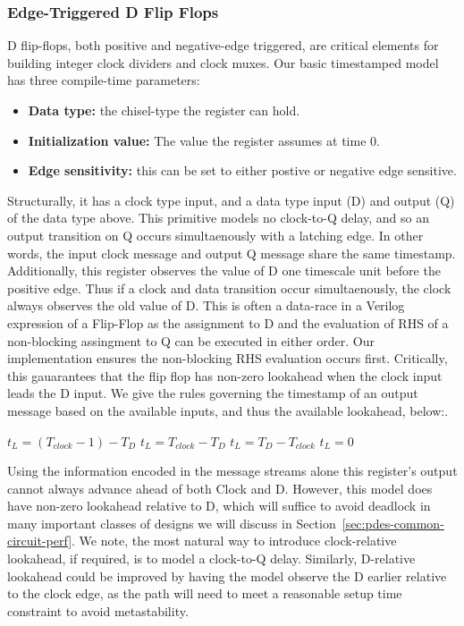 \subsubsection{Edge-Triggered D Flip Flops}
D flip-flops, both positive and negative-edge triggered, are critical elements for
building integer clock dividers and clock muxes. Our basic timestamped model has three compile-time parameters:

\begin{itemize}
 \item \textbf{Data type:} the chisel-type the register can hold.
 \item \textbf{Initialization value:} The value the register assumes at time 0.
 \item \textbf{Edge sensitivity:} this can be set to either postive or negative edge sensitive.
\end{itemize}

Structurally, it has a clock type input, and a data type input (D) and output
(Q) of the data type above.  This primitive models no clock-to-Q delay, and so
an output transition on Q occurs simultaenously with a latching edge.  In other
words, the input clock message and output Q message share the same timestamp.
Additionally, this register observes the value of D one timescale unit before
the positive edge. Thus if a clock and data transition occur simultaenously,
the clock always observes the old value of D.  This is often a data-race in a
Verilog expression of a Flip-Flop as the assignment to D and the evaluation of
RHS of a non-blocking assingment to Q can be executed in either order. Our
implementation ensures the non-blocking RHS evaluation occurs first.
Critically, this gauarantees that the flip flop has non-zero lookahead when the
clock input leads the D input. We give the rules governing the timestamp of an
output message based on the available inputs, and thus the available lookahead,
below:.

\begin{algorithmic}
            \State $t_{L} = (T_{clock} - 1) - T_{D}$
        \Else
            \State $t_{L} = T_{clock} - T_{D}$
        \EndIf
    \Else
            \State $t_{L} = T_{D} - T_{clock}$
        \Else
            \State $t_{L} = 0$
        \EndIf
    \EndIf
\end{algorithmic}

Using the information encoded in the message streams alone this register's
output cannot always advance ahead of both Clock and D. However, this model
does have non-zero lookahead relative to D, which will suffice to avoid
deadlock in many important classes of designs we will discuss in
Section~\ref{sec:pdes-common-circuit-perf}.  We note, the most natural way to
introduce clock-relative lookahead, if required, is to model a clock-to-Q
delay. Similarly, D-relative lookahead could be improved by having the model
observe the D earlier relative to the clock edge, as the path will need to meet
a reasonable setup time constraint to avoid metastability.

